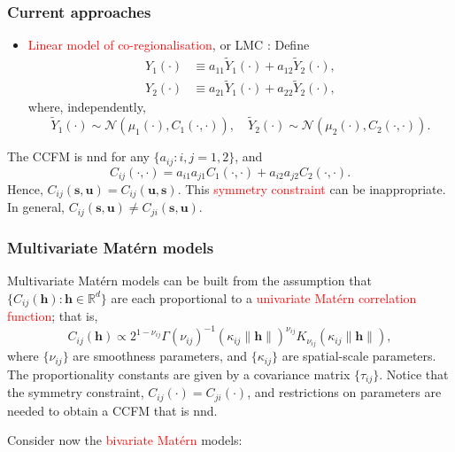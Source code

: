 \documentclass{beamer}
\newcommand{\Yt}{\widetilde{Y}}
\newcommand{\svec} {\textbf{s}}
\newcommand{\uvec} {\textbf{u}}
\newcommand{\s}{\mathbf{s}}
\renewcommand{\u}{\mathbf{u}}
\begin{document}


\begin{frame}
\frametitle{Current approaches}

\begin{itemize}
\item \textcolor{red}{Linear model of co-regionalisation}, or LMC \citep{JournelHuijbregts1978, Wackernagel1995}: Define
\begin{align*}
    Y_1(\cdot) &\equiv a_{11}\Yt_1(\cdot) + a_{12}\Yt_2(\cdot),\\
    Y_2(\cdot) &\equiv a_{21}\Yt_1(\cdot) + a_{22}\Yt_2(\cdot),
\end{align*}
where, independently,
\begin{equation*}
    \Yt_1(\cdot) \sim \mathcal{N}(\mu_1(\cdot), C_{1}(\cdot,\cdot)),\quad\Yt_2(\cdot) \sim \mathcal{N}(\mu_2(\cdot), C_{2}(\cdot,\cdot)).
\end{equation*}
\end{itemize}
The CCFM is nnd for any $\{a_{ij}: i,j = 1,2\}$, and 
$$
C_{ij}(\cdot,\cdot) = a_{i1}a_{j1}C_{1}(\cdot,\cdot) + a_{i2}a_{j2}C_{2}(\cdot,\cdot).
$$ 
Hence, $C_{ij}(\s,\u)=C_{ij}(\u,\s)$. This \textcolor{red}{symmetry constraint} can be inappropriate. In general, $C_{ij}(\svec,\uvec)\neq C_{ji}(\svec,\uvec)$.

\end{frame}


\begin{frame}
\frametitle{Multivariate Mat\'{e}rn models}
Multivariate Mat\'{e}rn models can be built from the assumption that $\{C_{ij}(\mathbf{h}):\mathbf{h}\in\mathbb{R}^d\}$ are each proportional to a \textcolor{red}{univariate Mat\'{e}rn correlation function}; that is,
$$
C_{ij}(\mathbf{h})\propto 2^{1-\nu_{ij}}\Gamma(\nu_{ij})^{-1}(\kappa_{ij}\|\mathbf{h}\|)^{\nu_{ij}}K_{\nu_{ij}}(\kappa_{ij}\|\mathbf{h}\|),
$$
where $\{\nu_{ij}\}$ are smoothness parameters, and $\{\kappa_{ij}\}$ are spatial-scale parameters. The proportionality constants are given by a covariance matrix $\{\tau_{ij}\}$. Notice that the symmetry constraint, $C_{ij}(\cdot)=C_{ji}(\cdot)$, and restrictions on parameters are needed to obtain a CCFM that is nnd. 

Consider now the \textcolor{red}{bivariate Mat\'{e}rn} models:
\vfill
\end{frame}
\end{document}
